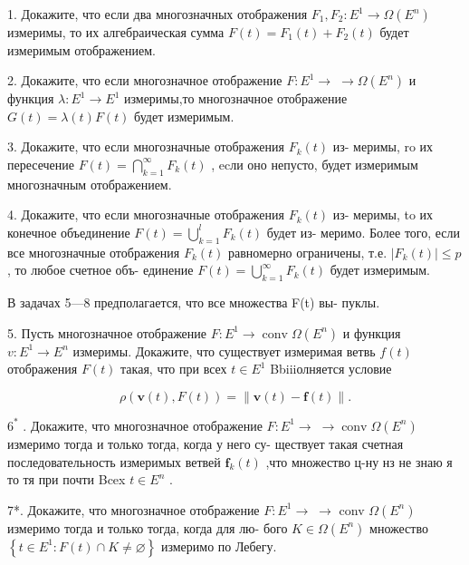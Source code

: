 \documentclass[8pt]{extarticle}
\begin{document}
1. Докажите, что если два многозначных отображения \({F}_{1},{F}_{2} : {E}^{1} \rightarrow  \Omega \left( {E}^{n}\right)\) измеримы, то их алгебраическая сумма \(F\left( t\right)  = {F}_{1}\left( t\right)  + {F}_{2}\left( t\right)\) будет измеримым отображением.

2. Докажите, что если многозначное отображение \(F : {E}^{1} \rightarrow \; \rightarrow  \Omega \left( {E}^{n}\right)\) и функция \(\lambda  : {E}^{1} \rightarrow  {E}^{1}\) измеримы,то многозначное отображение \(G\left( t\right)  = \lambda \left( t\right) F\left( t\right)\) будет измеримым.

3. Докажите, что если многозначные отображения \({F}_{k}\left( t\right)\) из- меримы, ro их пересечение \(F\left( t\right)  = \mathop{\bigcap }\limits_{{k = 1}}^{\infty }{F}_{k}\left( t\right)\) , ecли оно непусто, будет измеримым многозначным отображением.

4. Докажите, что если многозначные отображения \({F}_{k}\left( t\right)\) из- меримы, to их конечное объединение \(F\left( t\right)  = \mathop{\bigcup }\limits_{{k = 1}}^{l}{F}_{k}\left( t\right)\) будет из- меримо. Более того, если все многозначные отображения \({F}_{k}\left( t\right)\) равномерно ограничены, т.е. \(\left| {{F}_{k}\left( t\right) }\right|  \leq  p\) , то любое счетное объ- единение \(F\left( t\right)  = \mathop{\bigcup }\limits_{{k = 1}}^{\infty }{F}_{k}\left( t\right)\) будет измеримым.

В задачах 5—8 предполагается, что все множества F(t) вы- пуклы.

5. Пусть многозначное отображение \(F : {E}^{1} \rightarrow  \operatorname{conv}\Omega \left( {E}^{n}\right)\) и функция \(v : {E}^{1} \rightarrow  {E}^{n}\) измеримы. Докажите, что существует измеримая ветвь \(f\left( t\right)\) отображения \(F\left( t\right)\) такая, что при всех \(t \in  {E}^{1}\) Bbiiiолняется условие

\[
\rho \left( {\mathbf{v}\left( t\right) ,F\left( t\right) }\right)  = \parallel \mathbf{v}\left( t\right)  - \mathbf{f}\left( t\right) \parallel .
\]

\({6}^{ * }\) . Докажите, что многозначное отображение \(F : {E}^{1} \rightarrow \; \rightarrow  \operatorname{conv}\Omega \left( {E}^{n}\right)\) измеримо тогда и только тогда, когда у него су- ществует такая счетная последовательность измеримых ветвей \({\mathbf{f}}_{k}\left( t\right)\) ,что множество ц-ну нз не знаю я то тя при почти Bcex \(t \in  {E}^{n}\) .

7*. Докажите, что многозначное отображение \(F : {E}^{1} \rightarrow \; \rightarrow\) conv \(\Omega \left( {E}^{n}\right)\) измеримо тогда и только тогда, когда для лю- бого \(K \in  \Omega \left( {E}^{n}\right)\) множество \(\left\{  {t \in  {E}^{1} : F\left( t\right)  \cap  K \neq  \varnothing }\right\}\) измеримо по Лебегу.
\end{document}
